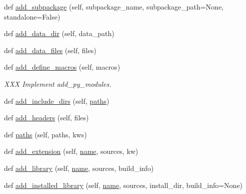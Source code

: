 \begin{DoxyCompactItemize}
\item 
def \hyperlink{classnumpy_1_1distutils_1_1misc__util_1_1Configuration_ac89f011fea8cc46a32ea6588e2c8e450}{add\+\_\+subpackage} (self, subpackage\+\_\+name, subpackage\+\_\+path=None, standalone=False)
\item 
def \hyperlink{classnumpy_1_1distutils_1_1misc__util_1_1Configuration_abb121d01aa05b12c03c0ff9180accb7b}{add\+\_\+data\+\_\+dir} (self, data\+\_\+path)
\item 
def \hyperlink{classnumpy_1_1distutils_1_1misc__util_1_1Configuration_a5e6c51717da5a84459ef592c7d6f1e33}{add\+\_\+data\+\_\+files} (self, files)
\item 
def \hyperlink{classnumpy_1_1distutils_1_1misc__util_1_1Configuration_aadd5028de0b81117e8b23fd3e125bc49}{add\+\_\+define\+\_\+macros} (self, macros)
\begin{DoxyCompactList}\small\item\em X\+XX Implement add\+\_\+py\+\_\+modules. \end{DoxyCompactList}\item 
def \hyperlink{classnumpy_1_1distutils_1_1misc__util_1_1Configuration_a2cf3fffe79288c8bd03972547ba434b5}{add\+\_\+include\+\_\+dirs} (self, \hyperlink{classnumpy_1_1distutils_1_1misc__util_1_1Configuration_a12121f45ce6ea3add0e88e248db3b58c}{paths})
\item 
def \hyperlink{classnumpy_1_1distutils_1_1misc__util_1_1Configuration_a678836b90abab275f46bea7e3b92a8c1}{add\+\_\+headers} (self, files)
\item 
def \hyperlink{classnumpy_1_1distutils_1_1misc__util_1_1Configuration_a12121f45ce6ea3add0e88e248db3b58c}{paths} (self, paths, kws)
\item 
def \hyperlink{classnumpy_1_1distutils_1_1misc__util_1_1Configuration_a3082c3f24bbe88c9d4d4155f83125a79}{add\+\_\+extension} (self, \hyperlink{classnumpy_1_1distutils_1_1misc__util_1_1Configuration_a0180c0a7786ccd3a68947c7b38d4a4b1}{name}, sources, kw)
\item 
def \hyperlink{classnumpy_1_1distutils_1_1misc__util_1_1Configuration_a2117c228c112b9eaedd553027ae6381f}{add\+\_\+library} (self, \hyperlink{classnumpy_1_1distutils_1_1misc__util_1_1Configuration_a0180c0a7786ccd3a68947c7b38d4a4b1}{name}, sources, build\+\_\+info)
\item 
def \hyperlink{classnumpy_1_1distutils_1_1misc__util_1_1Configuration_abe0ae35db2563114c814563b4e2224ff}{add\+\_\+installed\+\_\+library} (self, \hyperlink{classnumpy_1_1distutils_1_1misc__util_1_1Configuration_a0180c0a7786ccd3a68947c7b38d4a4b1}{name}, sources, install\+\_\+dir, build\+\_\+info=None)

\end{DoxyCompactItemize}
